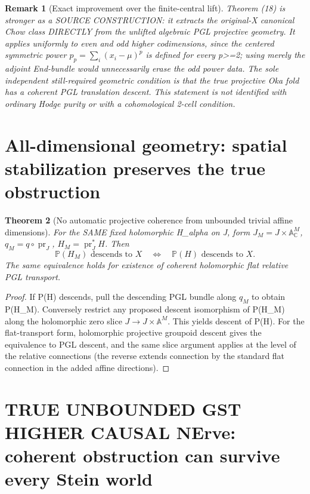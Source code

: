 \documentclass[11pt]{article}
\newtheorem{theorem}{Theorem}
\newtheorem{remark}[theorem]{Remark}
\begin{document}
\begin{remark}[Exact improvement over the finite-central lift]
Theorem (18) is stronger
as a SOURCE CONSTRUCTION:
it extracts the original-X
canonical Chow class DIRECTLY
from the unlifted algebraic
PGL projective geometry.
It applies uniformly to even
and odd higher codimensions,
since the centered symmetric
power $p_p=\sum_i(x_i-\mu)^p$
is defined for every p>=2;
using merely the adjoint
End-bundle would unnecessarily
erase the odd power data.
The sole independent
still-required geometric
condition is that the true
projective Oka fold has a
coherent PGL translation
descent. This statement is
not identified with ordinary
Hodge purity or with a
cohomological 2-cell condition.
\end{remark}

\section{All-dimensional geometry: spatial stabilization preserves the true obstruction}
\begin{theorem}[No automatic projective coherence from unbounded trivial affine dimensions]
For the SAME fixed holomorphic
H_alpha on J, form
$J_M=J\times\mathbb A_\mathbb C^M$,
$q_M=q\circ\operatorname{pr}_J$,
$H_M=\operatorname{pr}_J^*H$.
Then
\[
 \boxed{
 \mathbb P(H_M)\text{ descends to }X
 \quad\Longleftrightarrow\quad
 \mathbb P(H)\text{ descends to }X.
 }
                                                             \tag{11}
\]
The same equivalence holds for
existence of coherent holomorphic
flat relative PGL transport.
\end{theorem}
\begin{proof}
If P(H) descends, pull the
descending PGL bundle along
$q_M$ to obtain P(H_M).
Conversely restrict any proposed
descent isomorphism of P(H_M)
along the holomorphic zero slice
$J\to J\times\mathbb A^M$.
This yields descent of P(H).
For the flat-transport form,
holomorphic projective
groupoid descent gives the
equivalence to PGL descent,
and the same slice argument
applies at the level of
the relative connections
(the reverse extends connection
by the standard flat connection
in the added affine directions).
\end{proof}

\section{TRUE UNBOUNDED GST HIGHER CAUSAL NErve: coherent obstruction can survive every Stein world}
\end{document}
